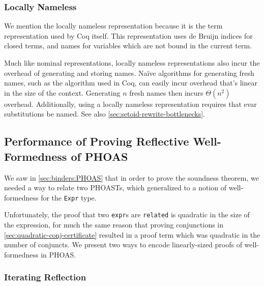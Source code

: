 \subsubsection{Locally Nameless} \label{sec:binders:locally-nameless}
We mention the locally nameless representation because it is the term representation used by Coq itself.
This representation uses de Bruijn indices for closed terms, and names for variables which are not bound in the current term.

Much like nominal representations, locally nameless representations also incur the overhead of generating and storing names.
Na\"ive algorithms for generating fresh names, such as the algorithm used in Coq, can easily incur overhead that's linear in the size of the context.
Generating $n$ fresh names then incurs $\mathcal \Theta(n^2)$ overhead.
Additionally, using a locally nameless representation requires that evar substitutions be named.
See also \autoref{sec:setoid-rewrite-bottlenecks}.

\subsection{Performance of Proving Reflective Well-Formedness of PHOAS} \label{sec:wf:perf}

We saw in \autoref{sec:binders:PHOAS} that in order to prove the soundness theorem, we needed a way to relate two PHOASTs, which generalized to a notion of well-formedness for the \texttt{Expr} type.

Unfortunately, the proof that two \texttt{expr}s are \texttt{related} is quadratic in the size of the expression, for much the same reason that proving conjunctions in \autoref{sec:quadratic-conj-certificate} resulted in a proof term which was quadratic in the number of conjuncts.
We present two ways to encode linearly-sized proofs of well-formedness in PHOAS.

\subsubsection{Iterating Reflection} \label{sec:wf:perf:reflective}

